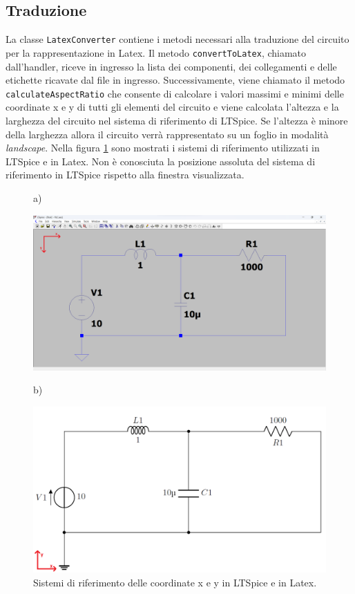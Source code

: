 \subsection{Traduzione}
La classe \texttt{LatexConverter} contiene i metodi necessari alla traduzione del circuito per la rappresentazione in Latex. Il metodo \texttt{convertToLatex}, chiamato dall'handler, riceve in ingresso la lista dei componenti, dei collegamenti e delle etichette ricavate dal file in ingresso. Successivamente, viene chiamato il metodo \texttt{calculateAspectRatio} che consente di calcolare i valori massimi e minimi delle coordinate x e y di tutti gli elementi del circuito e viene calcolata l'altezza e la larghezza del circuito nel sistema di riferimento di LTSpice. Se l'altezza è minore della larghezza allora il circuito verrà rappresentato su un foglio in modalità \textit{landscape}. Nella figura \ref{fig:sdr} sono mostrati i sistemi di riferimento utilizzati in LTSpice e in Latex. Non è conosciuta la posizione assoluta del sistema di riferimento in LTSpice rispetto alla finestra visualizzata.
\begin{figure}[h!]
	\centering
	a)
	\begin{minipage}{.460\textwidth}
		\includegraphics[width=\linewidth]{./ImageFiles/sdr-lt.png}
	\end{minipage}
	b)
	\begin{minipage}{.460\textwidth}
		\includegraphics[width=\linewidth]{./ImageFiles/sdr-latex.png}
	\end{minipage}
	\caption{Sistemi di riferimento delle coordinate x e y in LTSpice e in Latex.}
	\label{fig:sdr}
\end{figure}

